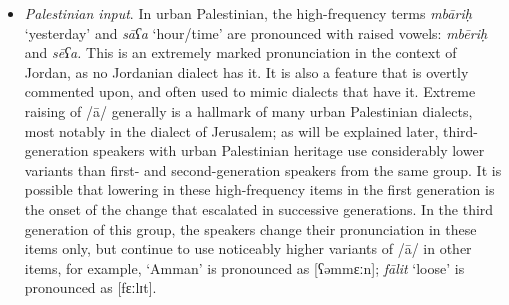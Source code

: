 \documentclass[output=paper]{langsci/langscibook}
\begin{document}
\begin{itemize}
\item[] \textit{Palestinian input}. In urban Palestinian, the high-frequency terms \textit{mbāriḥ} `yesterday’ and \textit{sāʕa} ‘hour/time’ are pronounced with raised vowels: \textit{mbēriḥ} and \textit{sēʕa.} This is an extremely marked pronunciation in the context of Jordan, as no Jordanian dialect has it. It is also a feature that is overtly commented upon, and often used to mimic dialects that have it. Extreme raising of /ā/ generally is a hallmark of many urban Palestinian dialects, most notably in the dialect of Jerusalem; as will be explained later, third-generation speakers with urban Palestinian heritage use considerably lower variants than first- and second-generation speakers from the same group. It is possible that lowering in these high-frequency items in the first generation is the onset of the change that escalated in successive generations. In the third generation of this group, the speakers change their pronunciation in these items only, but continue to use noticeably higher variants of /ā/ in other items, for example, ‘Amman’ is pronounced as [ʕəmmɛːn]; \textit{fālit} ‘loose’ is pronounced as [fɛːlɪt].
\end{itemize}
\end{document}
